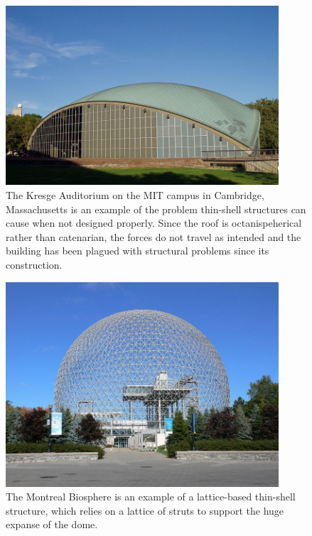 \documentclass{thesis}
\begin{document}
\begin{figure}
\centering
\includegraphics[width=4in]{images/kresge_auditorium.jpg}
\caption[The Kresge Auditorium]{The Kresge Auditorium on the MIT campus in Cambridge, Massachusetts is an example of the problem thin-shell
structures can cause when not designed properly.  Since the roof is octanispeherical rather than catenarian, the forces do not travel as
intended and the building has been plagued with structural problems since its construction.\footnotemark}
\label{fig:kresge_aud}
\end{figure}

\begin{figure}
\centering
\includegraphics[width=4in]{images/montreal_biosphere.jpg}
\caption[The Montreal Biosphere]{The Montreal Biosphere is an example of a lattice-based thin-shell structure, which relies on a lattice of
struts to support the huge expanse of the dome.\footnotemark}
\label{fig:montreal_bio}
\end{figure}
\end{document}

